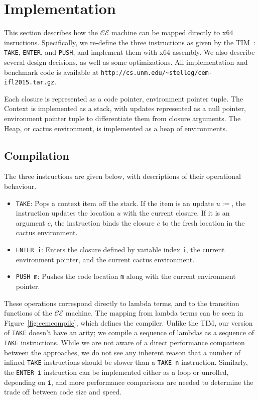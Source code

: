 \section{Implementation} \label{sec:impl}

This section describes how the $\mathcal{CE}$ machine can be mapped directly to
x64 insructions. Specifically, we re-define the three instructions as given by
the TIM~\cite{TIM}: \texttt{TAKE}, \texttt{ENTER}, and \texttt{PUSH}, and
implement them with x64 assembly. We also describe several design decisions, as
well as some optimizations. All implementation and benchmark code is available
at \texttt{http://cs.unm.edu/\textasciitilde stelleg/cem-ifl2015.tar.gz}.

Each closure is represented as a code pointer, environment pointer tuple. The
Context is implemented as a stack, with updates represented as a null pointer,
environment pointer tuple to differentiate them from closure arguments. The
Heap, or cactus environment, is implemented as a heap of environments. 

\subsection{Compilation}
The three instructions are given below, with descriptions of their operational
behaviour. 

\begin{itemize}
\item \texttt{TAKE}: Pops a context item off the stack. If the item is an
update $u:=$, the instruction updates the location $u$ with the current closure.
If it is an argument $c$, the instruction binds the closure $c$ to the fresh
location in the cactus environment.
\item \texttt{ENTER i}: Enters the closure defined by variable index \texttt{i},
the current environment pointer, and the current cactus environment.  \item
\texttt{PUSH m}: Pushes the code location \texttt{m} along with the
current environment pointer. 
\end{itemize}

These operations correspond directly to lambda terms, and to the transition
functions of the $\mathcal{CE}$ machine. The mapping from lambda terms can be
seen in Figure~\ref{fig:cemcompile}, which defines the compiler. Unlike the TIM,
our version of \texttt{TAKE} doesn't have an arity; we compile a sequence of
lambdas as a sequence of \texttt{TAKE} instructions. While we are not aware of a
direct performance comparison between the approaches, we do not see any inherent
reason that a number of inlined \texttt{TAKE} instructions should be slower than
a \texttt{TAKE n} instruction.  Similarly, the \texttt{ENTER i} instruction can
be implemented either as a loop or unrolled, depending on \texttt{i}, and more
performance comparisons are needed to determine the trade off between code size
and speed.

